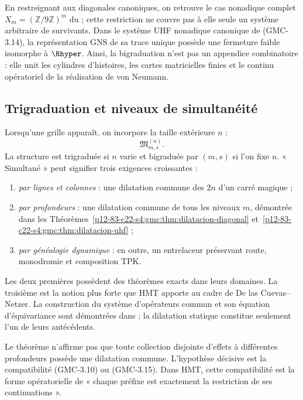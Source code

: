 En restreignant  aux diagonales canoniques, on retrouve
le cas nonadique complet $X_m=(\mathbb Z/9\mathbb Z)^m$ du
 ; cette restriction ne couvre pas à elle seule un
système arbitraire de survivants. Dans le système UHF nonadique canonique de
\textup{(GMC-3.14)}, la représentation GNS de sa trace unique possède une fermeture faible
isomorphe à $\Rhyper$. Ainsi, la bigraduation n'est pas un appendice combinatoire : elle unit
les cylindres d'histoires, les cartes matricielles finies et le continu
opératoriel de la réalisation de von Neumann.

\subsection{Trigraduation et niveaux de simultanéité}

Lorsqu'une grille apparaît, on incorpore la taille extérieure $n$ :
\[
 \mathfrak M_{m,s}^{(n)}.
 \tag{GMC-3.17}
\]
La structure est trigraduée si $n$ varie et bigraduée par $(m,s)$ si l'on fixe
$n$. « Simultané » peut signifier trois exigences croissantes :

\begin{enumerate}
 \item \emph{par lignes et colonnes} : une dilatation commune des $2n$ \POVM
 d'un carré magique ;
 \item \emph{par profondeurs} : une dilatation commune de tous les niveaux
 $m$, démontrée dans les Théorèmes~\ref{p12-83-c22-s4:gmc:thm:dilatacion-diagonal}
 et~\ref{p12-83-c22-s4:gmc:thm:dilatacion-uhf} ;
 \item \emph{par généalogie dynamique} : en outre, un entrelaceur préservant
 route, monodromie et composition TPK.
\end{enumerate}

Les deux premières possèdent des théorèmes exacts dans leurs domaines. La troisième est la
notion plus forte que HMT apporte au cadre de De las Cuevas--Netzer. La
construction du système d'opérateurs commun et son équation d'équivariance sont
démontrées dans  ; la dilatation statique constitue
seulement l'un de leurs antécédents.

\begin{controlbox}
Le théorème n'affirme pas que toute collection disjointe d'effets à différentes
profondeurs possède une dilatation commune. L'hypothèse décisive est la
compatibilité \textup{(GMC-3.10)} ou \textup{(GMC-3.15)}. Dans HMT, cette compatibilité est la
forme opératorielle de « chaque préfixe est exactement la restriction de ses
continuations ».
\end{controlbox}


